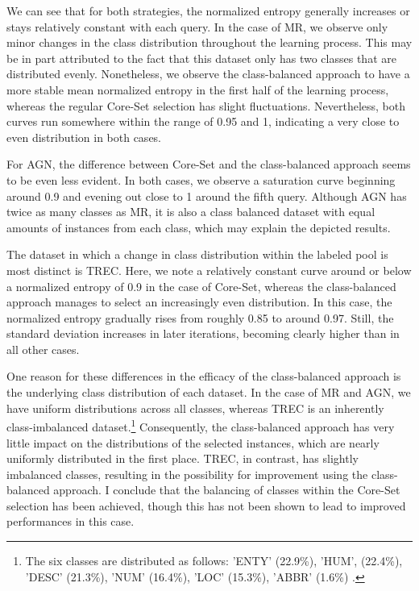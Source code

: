 \documentclass[english,bachelor,ul]{webisthesis} %
\begin{document}
We can see that for both strategies, the normalized entropy generally increases or stays relatively constant with each query. In the case of MR, we observe only minor changes in the class distribution throughout the learning process. This may be in part attributed to the fact that this dataset only has two classes that are distributed evenly. Nonetheless, we observe the class-balanced approach to have a more stable mean normalized entropy in the first half of the learning process, whereas the regular Core-Set selection has slight fluctuations. Nevertheless, both curves run somewhere within the range of 0.95 and 1, indicating a very close to even distribution in both cases. 

For AGN, the difference between Core-Set and the class-balanced approach seems to be even less evident. In both cases, we observe a saturation curve beginning around 0.9 and evening out close to 1 around the fifth query. Although AGN has twice as many classes as MR, it is also a class balanced dataset with equal amounts of instances from each class, which may explain the depicted results.

The dataset in which a change in class distribution within the labeled pool is most distinct is TREC. Here, we note a relatively constant curve around or below a normalized entropy of 0.9 in the case of Core-Set, whereas the class-balanced approach manages to select an increasingly even distribution. In this case, the normalized entropy gradually rises from roughly 0.85 to around 0.97. Still, the standard deviation increases in later iterations, becoming clearly higher than in all other cases. 

One reason for these differences in the efficacy of the class-balanced approach is the underlying class distribution of each dataset. In the case of MR and AGN, we have uniform distributions across all classes, whereas TREC is an inherently class-imbalanced dataset.\footnote{The six classes are distributed as follows: 'ENTY' (22.9\%), 'HUM', (22.4\%), 'DESC' (21.3\%), 'NUM' (16.4\%), 'LOC' (15.3\%), 'ABBR' (1.6\%) \citep{DBLP:journals/nle/LiR06}.} Consequently, the class-balanced approach has very little impact on the distributions of the selected instances, which are nearly uniformly distributed in the first place. TREC, in contrast, has slightly imbalanced classes, resulting in the possibility for improvement using the class-balanced approach. I conclude that the balancing of classes within the Core-Set selection has been achieved, though this has not been shown to lead to improved performances in this case.
\end{document}
